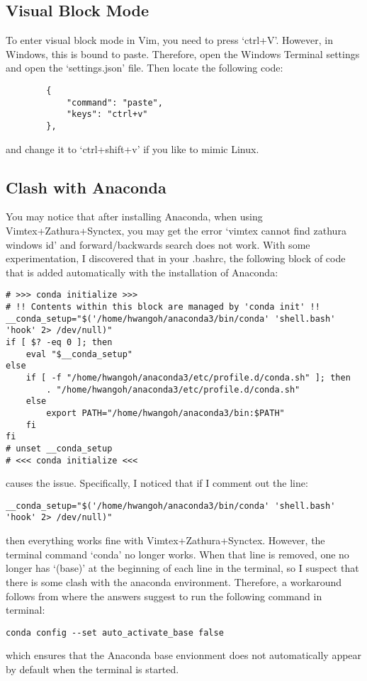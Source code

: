 \subsection{Visual Block Mode}
To enter visual block mode in Vim, you need to press `ctrl+V'. However, in
Windows, this is bound to paste. Therefore, open the Windows Terminal settings
and open the `settings.json' file. Then locate the following code:
\begin{lstlisting}
        {
            "command": "paste",
            "keys": "ctrl+v"
        },
\end{lstlisting}
and change it to `ctrl+shift+v' if you like to mimic Linux.

\subsection{Clash with Anaconda}
You may notice that after installing Anaconda, when using
Vimtex+Zathura+Synctex, you may get the error `vimtex cannot find zathura
windows id' and forward/backwards search does not work. With some
experimentation, I discovered that in your .bashrc, the following block of code
that is added automatically with the installation of Anaconda:
\begin{lstlisting}
# >>> conda initialize >>>
# !! Contents within this block are managed by 'conda init' !!
__conda_setup="$('/home/hwangoh/anaconda3/bin/conda' 'shell.bash' 'hook' 2> /dev/null)"
if [ $? -eq 0 ]; then
    eval "$__conda_setup"
else
    if [ -f "/home/hwangoh/anaconda3/etc/profile.d/conda.sh" ]; then
        . "/home/hwangoh/anaconda3/etc/profile.d/conda.sh"
    else
        export PATH="/home/hwangoh/anaconda3/bin:$PATH"
    fi
fi
# unset __conda_setup
# <<< conda initialize <<<
\end{lstlisting}
causes the issue. Specifically, I noticed that if I comment out the line:
\begin{lstlisting}
__conda_setup="$('/home/hwangoh/anaconda3/bin/conda' 'shell.bash' 'hook' 2> /dev/null)"
\end{lstlisting}
then everything works fine with Vimtex+Zathura+Synctex. However, the terminal
command `conda' no longer works. When that line is removed, one no longer has
`(base)' at the beginning of each line in the terminal, so I suspect that there
is some clash with the anaconda environment. Therefore, a workaround follows
from \cite{drylabrebel2019how} where the answers suggest to run the
following command in terminal:
\begin{lstlisting}
conda config --set auto_activate_base false
\end{lstlisting}
which ensures that the Anaconda base envionment does not automatically appear by
default when the terminal is started.\\

